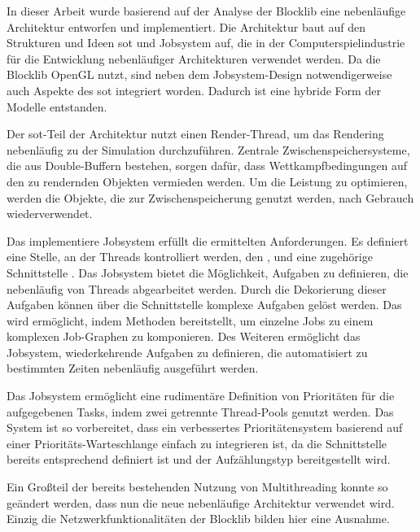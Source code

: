 In dieser Arbeit wurde basierend auf der Analyse der Blocklib eine nebenläufige Architektur entworfen und implementiert. Die Architektur baut auf den Strukturen und Ideen \acf{sot} und Jobsystem auf, die in der Computerspielindustrie für die Entwicklung nebenläufiger Architekturen verwendet werden. Da die Blocklib OpenGL nutzt, sind neben dem Jobsystem-Design notwendigerweise auch Aspekte des \ac{sot} integriert worden. Dadurch ist eine hybride Form der Modelle entstanden.

Der \ac{sot}-Teil der Architektur nutzt einen Render-Thread, um das Rendering nebenläufig zu der Simulation durchzuführen. Zentrale Zwischenspeichersysteme, die aus Double-Buffern bestehen, sorgen dafür, dass Wettkampfbedingungen auf den zu rendernden Objekten vermieden werden. Um die Leistung zu optimieren, werden die Objekte, die zur Zwischenspeicherung genutzt werden, nach Gebrauch wiederverwendet.

Das implementiere Jobsystem erfüllt die ermittelten Anforderungen. Es definiert eine Stelle, an der Threads kontrolliert werden, den \classBlocklibExecutor{}, und eine zugehörige Schnittstelle \classBlocklibExecutorService{}. Das Jobsystem bietet die Möglichkeit, Aufgaben zu definieren, die nebenläufig von Threads abgearbeitet werden. Durch die Dekorierung dieser Aufgaben können über die Schnittstelle \classCompletionStage{} komplexe Aufgaben gelöst werden. Das wird ermöglicht, indem \classCompletionStage{} Methoden bereitstellt, um einzelne Jobs zu einem komplexen Job-Graphen zu komponieren. Des Weiteren ermöglicht das Jobsystem, wiederkehrende Aufgaben zu definieren, die automatisiert zu bestimmten Zeiten nebenläufig ausgeführt werden.

Das Jobsystem ermöglicht eine rudimentäre Definition von Prioritäten für die aufgegebenen Tasks, indem zwei getrennte Thread-Pools genutzt werden. Das System ist so vorbereitet, dass ein verbessertes Prioritätensystem basierend auf einer Prioritäts-Warteschlange einfach zu integrieren ist, da die Schnittstelle \classBlocklibExecutorService{} bereits entsprechend definiert ist und der Aufzählungstyp \classTaskPriority{} bereitgestellt wird.

Ein Großteil der bereits bestehenden Nutzung von Multithreading konnte so geändert werden, dass nun die neue nebenläufige Architektur verwendet wird. Einzig die Netzwerkfunktionalitäten der Blocklib bilden hier eine Ausnahme.

